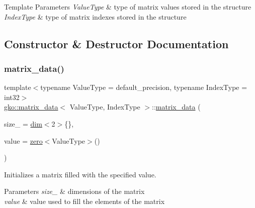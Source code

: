 \begin{DoxyTemplParams}{Template Parameters}
{\em Value\+Type} & type of matrix values stored in the structure \\
\hline
{\em Index\+Type} & type of matrix indexes stored in the structure \\
\hline
\end{DoxyTemplParams}


\subsection{Constructor \& Destructor Documentation}
\mbox{\label{structgko_1_1matrix__data_a4be80a4afbd7f905aa4e73fbeb9df762}} 
\subsubsection{\texorpdfstring{matrix\+\_\+data()}{matrix\_data()}\hspace{0.1cm}{\footnotesize\ttfamily [1/6]}}
{\footnotesize\ttfamily template$<$typename Value\+Type = default\+\_\+precision, typename Index\+Type = int32$>$ \\
\hyperlink{structgko_1_1matrix__data}{gko\+::matrix\+\_\+data}$<$ Value\+Type, Index\+Type $>$\+::\hyperlink{structgko_1_1matrix__data}{matrix\+\_\+data} (\begin{DoxyParamCaption}\item[{\hyperlink{structgko_1_1dim}{dim}$<$ 2 $>$}]{size\+\_\+ = {\ttfamily \hyperlink{structgko_1_1dim}{dim}$<$2$>$\{\}},  }\item[{Value\+Type}]{value = {\ttfamily \hyperlink{namespacegko_a70dbe01ff95c7b953d3d737424c6feb5}{zero}$<$ValueType$>$()} }\end{DoxyParamCaption})\hspace{0.3cm}{\ttfamily [inline]}}



Initializes a matrix filled with the specified value. 


\begin{DoxyParams}{Parameters}
{\em size\+\_\+} & dimensions of the matrix \\
\hline
{\em value} & value used to fill the elements of the matrix \\
\hline
\end{DoxyParams}
\mbox{\label{structgko_1_1matrix__data_aea89944190aba3ace872bf31fd98fd3d}} 
